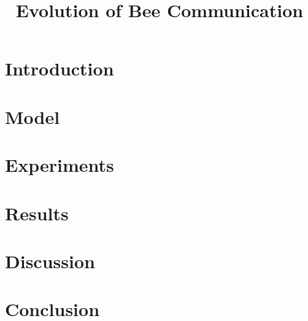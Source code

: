 \documentclass[11pt]{article}
\title{Evolution of Bee Communication}
\author{}
\date{}
\begin{document}
\maketitle

\begin{abstract}
\end{abstract}

\section{Introduction}

\section{Model}

\section{Experiments}

\section{Results}

\section{Discussion}

\section{Conclusion}



\end{document}
